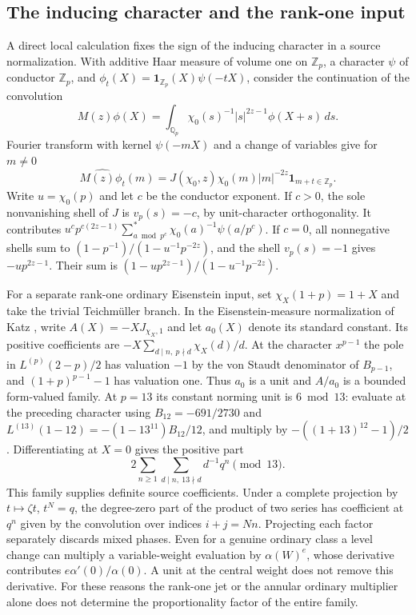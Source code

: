 \documentclass[11pt]{article}
\begin{document}
\subsection{The inducing character and the rank-one input}
A direct local calculation fixes the sign of the inducing character
in a source normalization. With additive Haar measure of volume one
on $\mathbb Z_p$, a character $\psi$ of conductor $\mathbb Z_p$,
and $\phi_t(X)=\mathbf1_{\mathbb Z_p}(X)\psi(-tX)$, consider the
continuation of the convolution
\[
 M(z)\phi(X)=\int_{\mathbb Q_p}\chi_0(s)^{-1}|s|^{2z-1}\phi(X+s)\,ds.
\]
Fourier transform with kernel $\psi(-mX)$ and a change of variables
give for $m\ne0$
\[
 \widehat{M(z)\phi_t}(m)
 =J(\chi_0,z)\chi_0(m)|m|^{-2z}\mathbf1_{m+t\in\mathbb Z_p}.
\]
Write $u=\chi_0(p)$ and let $c$ be the conductor exponent.
If $c>0$, the sole nonvanishing shell of $J$ is $v_p(s)=-c$, by
unit-character orthogonality. It contributes
$u^c p^{c(2z-1)}\sum_{a\bmod p^c}^{*}\chi_0(a)^{-1}\psi(a/p^c)$.
If $c=0$, all nonnegative shells sum to
$(1-p^{-1})/(1-u^{-1}p^{-2z})$, and the shell $v_p(s)=-1$ gives
$-u p^{2z-1}$. Their sum is
$(1-u p^{2z-1})/(1-u^{-1}p^{-2z})$.

For a separate rank-one ordinary Eisenstein input, set
$\chi_X(1+p)=1+X$ and take the trivial Teichm\"uller branch. In the
Eisenstein-measure normalization of Katz
\cite[\S\S3.3--3.6]{Katz}, write $A(X)=-X J_{\chi_X,1}$ and let
$a_0(X)$ denote its standard constant. Its positive coefficients
are $-X\sum_{d\mid n,\ p\nmid d}\chi_X(d)/d$. At the character
$x^{p-1}$ the pole in $L^{(p)}(2-p)/2$ has valuation $-1$ by the
von Staudt denominator of $B_{p-1}$, and
$(1+p)^{p-1}-1$ has valuation one. Thus $a_0$ is a unit and
$A/a_0$ is a bounded form-valued family. At $p=13$ its constant
norming unit is $6\bmod13$: evaluate at the preceding character using
$B_{12}=-691/2730$ and $L^{(13)}(1-12)=-(1-13^{11})B_{12}/12$,
and multiply by $-((1+13)^{12}-1)/2$.
Differentiating at $X=0$ gives the positive part
\[
 2\sum_{n\ge1}\sum_{d\mid n,\ 13\nmid d} d^{-1}q^n \pmod {13}.
\]
This family supplies definite source coefficients. Under a complete
projection by $t\mapsto\zeta t$, $t^N=q$, the degree-zero part of the
product of two series has coefficient at $q^n$ given by the convolution
over indices $i+j=Nn$. Projecting each factor separately discards
mixed phases. Even for a genuine ordinary class a level change can
multiply a variable-weight evaluation by $\alpha(W)^e$, whose
derivative contributes $e\alpha'(0)/\alpha(0)$. A unit at the
central weight does not remove this derivative. For these reasons the
rank-one jet or the annular ordinary multiplier alone does not determine
the proportionality factor of the entire family.
\end{document}
